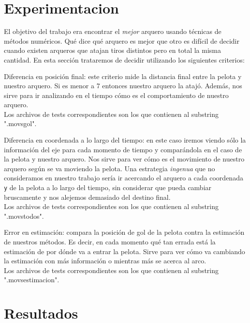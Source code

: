\section{Experimentacion}
El objetivo del trabajo era encontrar el \textit{mejor} arquero usando técnicas de métodos
numéricos. Qué dice qué arquero es mejor que otro es difícil de decidir cuando existen arqueros que
atajan tiros distintos pero en total la misma cantidad. En esta sección trataremos de decidir
utilizando los siguientes criterios:
\begin{compactitem}
  \item Diferencia en posición final: este criterio mide la distancia final entre la pelota y
    nuestro arquero. Si es menor a 7 entonces nuestro arquero la atajó. Además, nos sirve para ir
    analizando en el tiempo cómo es el comportamiento de nuestro arquero. \\
    Los archivos de tests correspondientes son los que contienen al substring ".movsgol".
  \item Diferencia en coordenada  a lo largo del tiempo: en este caso iremos viendo sólo la
    información del eje  para cada momento de tiempo y comparándola en el caso de la pelota
    y nuestro arquero. Nos sirve para ver cómo es el movimiento de nuestro arquero según se va
    moviendo la pelota. Una estrategia \textit{ingenua} que no consideramos en nuestro trabajo sería
    ir acercando el arquero a cada coordenada \texttt{y} de la pelota a lo largo del tiempo, sin
    considerar que pueda cambiar bruscamente y nos alejemos demasiado del destino final.
    \\
    Los archivos de tests correspondientes son los que contienen al substring ".movstodos".
  \item Error en estimación: compara la posición de gol de la pelota contra la estimación de
    nuestros métodos. Es decir, en cada momento qué tan errada está la estimación de por dónde va a
    entrar la pelota. Sirve para ver cómo va cambiando la estimación con más información o mientras
    más se acerca al arco.
    \\
    Los archivos de tests correspondientes son los que contienen al substring ".movsestimacion".
  \end{compactitem}


\section{Resultados}
